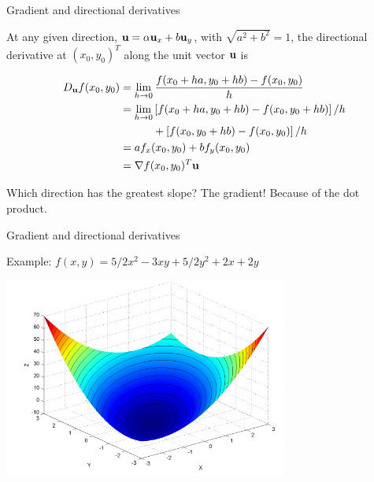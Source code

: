 \documentclass[notes]{beamer}
\begin{document}
\begin{frame}{Gradient and directional derivatives}

At any given direction, \(\mathbf{u} = \alpha \mathbf{u}_x + b \mathbf{u}_y\), with
\(\sqrt{a^2+b^2}=1\), the directional derivative at \((x_0, y_0 )^T\)
along the unit vector \(\mathbf{u}\) is

\begin{equation*}
    \begin{aligned}
        D_{\mathbf{u}} f(x_0,y_0) &= \lim_{h \rightarrow 0} \frac{f(x_0 + ha, y_0+hb)-f(x_0,y_0) }{h} \\  
        &= \lim_{h \rightarrow 0} \left[f(x_0+ha , y_0 +hb)-f(x_0,y_0+hb)\right]/h \\
         &\qquad \quad +\left[f(x_0,y_0+hb)-f(x_0,y_0)\right]/{h} \\
        &= af_x(x_0,y_0)+bf_y(x_0,y_0) \\
        &= \nabla f(x_0,y_0)^T \mathbf{u}
    \end{aligned}
\end{equation*}

Which direction has the greatest slope? The gradient! Because of the dot
product.

\end{frame}

\begin{frame}{Gradient and directional derivatives}

Example: \(f(x,y)=5/2 x^2 -3xy + 5/2 y^2 +2x +2y\)

\centering 

\includegraphics[width=0.70000\textwidth]{2018-03-09-22-31-32.png}\\

\end{frame}
\end{document}
